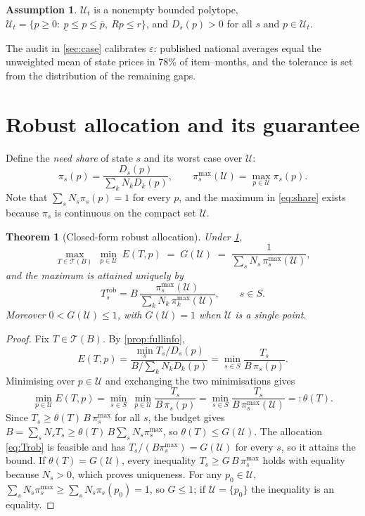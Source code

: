 \documentclass[preprint,12pt,number]{elsarticle}%
\newtheorem{theorem}{Theorem}
\theoremstyle{definition}
\newtheorem{assumption}{Assumption}
\theoremstyle{remark}
\newcommand{\U}{\mathcal{U}}
\newcommand{\pimax}{\pi^{\max}}
\begin{document}
\begin{assumption}\label{ass:polytope}
$\U_t$ is a nonempty bounded polytope, $\U_t=\{p\ge 0:\ \underline p\le p\le\overline p,\ Rp\le r\}$, and $D_s(p)>0$ for all $s$ and $p\in\U_t$.
\end{assumption}

The audit in \cref{sec:case} calibrates $\varepsilon$: published national averages equal the unweighted mean of state prices in 78\% of item--months, and the tolerance is set from the distribution of the remaining gaps.

\section{Robust allocation and its guarantee}\label{sec:robust}

Define the \emph{need share} of state $s$ and its worst case over $\U$:
\begin{equation}\label{eq:share}
\pi_s(p)=\frac{D_s(p)}{\sum_kN_kD_k(p)},\qquad
\pimax_s(\U)=\max_{p\in\U}\pi_s(p).
\end{equation}
Note that $\sum_sN_s\pi_s(p)=1$ for every $p$, and the maximum in \eqref{eq:share} exists because $\pi_s$ is continuous on the compact set $\U$.

\begin{theorem}[Closed-form robust allocation]\label{thm:robust}
Under \cref{ass:polytope},
\begin{equation}\label{eq:maximin}
\max_{T\in\mathcal T(B)}\ \min_{p\in\U}\ E(T,p)\;=\;G(\U)\;=\;\frac{1}{\sum_{s}N_s\,\pimax_s(\U)},
\end{equation}
and the maximum is attained uniquely by
\begin{equation}\label{eq:Trob}
T^{\mathrm{rob}}_s=B\,\frac{\pimax_s(\U)}{\sum_kN_k\,\pimax_k(\U)},\qquad s\in S.
\end{equation}
Moreover $0<G(\U)\le 1$, with $G(\U)=1$ when $\U$ is a single point.
\end{theorem}

\begin{proof}
Fix $T\in\mathcal T(B)$. By \cref{prop:fullinfo},
\[
E(T,p)=\frac{\min_s T_s/D_s(p)}{B/\sum_kN_kD_k(p)}=\min_{s\in S}\frac{T_s}{B\,\pi_s(p)}.
\]
Minimising over $p\in\U$ and exchanging the two minimisations gives
\[
\min_{p\in\U}E(T,p)=\min_{s\in S}\ \min_{p\in\U}\frac{T_s}{B\,\pi_s(p)}=\min_{s\in S}\frac{T_s}{B\,\pimax_s(\U)}=:\theta(T).
\]
Since $T_s\ge\theta(T)\,B\,\pimax_s$ for all $s$, the budget gives $B=\sum_sN_sT_s\ge\theta(T)\,B\sum_sN_s\pimax_s$, so $\theta(T)\le G(\U)$. The allocation \eqref{eq:Trob} is feasible and has $T_s/(B\pimax_s)=G(\U)$ for every $s$, so it attains the bound. If $\theta(T)=G(\U)$, every inequality $T_s\ge G\,B\,\pimax_s$ holds with equality because $N_s>0$, which proves uniqueness. For any $p_0\in\U$, $\sum_sN_s\pimax_s\ge\sum_sN_s\pi_s(p_0)=1$, so $G\le 1$; if $\U=\{p_0\}$ the inequality is an equality.
\end{proof}
\end{document}
